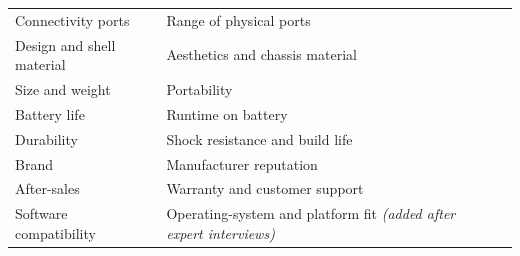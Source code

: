 \begin{longtable}{@{}L{2.55cm}L{4.35cm}L{7.25cm}@{}}
    Connectivity ports & Range of physical ports & \parencite{maghsoudi_hybrid_2026,sonmez_cakir_determination_2020} \\
    Design and shell material & Aesthetics and chassis material & \parencite{weng_siew_lam_evaluation_2023,kang_study_2022,maghsoudi_hybrid_2026} \\
    Size and weight & Portability & \parencite{weng_siew_lam_evaluation_2023,zakeri_decision_2023,maghsoudi_hybrid_2026} \\
    Battery life & Runtime on battery & \parencite{weng_siew_lam_evaluation_2023,liao_determinants_2022,maghsoudi_hybrid_2026,kang_study_2022,rau_optimal_2018} \\
    Durability & Shock resistance and build life & \parencite{zakeri_decision_2023,weng_siew_lam_evaluation_2023,liao_determinants_2022} \\
    Brand & Manufacturer reputation & \parencite{sonmez_cakir_determination_2020,rau_optimal_2018,jimenez-parra_key_2014,weng_siew_lam_evaluation_2023} \\
    After-sales & Warranty and customer support & \parencite{sostar_assessment_2023,maghsoudi_hybrid_2026,kang_study_2022} \\
    Software compatibility & Operating-system and platform fit \newline \textit{(added after expert interviews)} & \parencite{guan_cognitive_2022,weng_siew_lam_evaluation_2023} \\
  \end{longtable}
\endgroup
